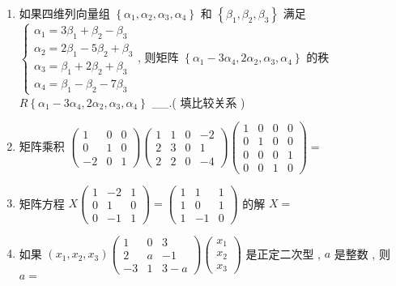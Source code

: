 \documentclass[10pt]{article}
\begin{document}
{\begin{enumerate}
  \item  如果四维列向量组  $\left\{\alpha_{1}, \alpha_{2}, \alpha_{3}, \alpha_{4}\right\}$  和  $\left\{\beta_{1}, \beta_{2}, \beta_{3}\right\}$  满足  $\left\{\begin{array}{c}\alpha_{1}=3 \beta_{1}+\beta_{2}-\beta_{3} \\ \alpha_{2}=2 \beta_{1}-5 \beta_{2}+\beta_{3} \\ \alpha_{3}=\beta_{1}+2 \beta_{2}+\beta_{3} \\ \alpha_{4}=\beta_{1}-\beta_{2}-7 \beta_{3}\end{array}\right.$,  则矩阵  $\left\{\alpha_{1}-3 \alpha_{4}, 2 \alpha_{2}, \alpha_{3}, \alpha_{4}\right\}$  的秩  $R\left\{\alpha_{1}-3 \alpha_{4}, 2 \alpha_{2}, \alpha_{3}, \alpha_{4}\right\}$ \_\_.( 填比较关系 )

  \item  矩阵乘积  $\left(\begin{array}{ccc}1 & 0 & 0 \\ 0 & 1 & 0 \\ -2 & 0 & 1\end{array}\right)\left(\begin{array}{cccc}1 & 1 & 0 & -2 \\ 2 & 3 & 0 & 1 \\ 2 & 2 & 0 & -4\end{array}\right)\left(\begin{array}{llll}1 & 0 & 0 & 0 \\ 0 & 1 & 0 & 0 \\ 0 & 0 & 0 & 1 \\ 0 & 0 & 1 & 0\end{array}\right)=$

  \item  矩阵方程  $X\left(\begin{array}{ccc}1 & -2 & 1 \\ 0 & 1 & 0 \\ 0 & -1 & 1\end{array}\right)=\left(\begin{array}{ccc}1 & 1 & 1 \\ 1 & 0 & 1 \\ 1 & -1 & 0\end{array}\right)$  的解  $X=$

  \item  如果  $\left(x_{1}, x_{2}, x_{3}\right)\left(\begin{array}{ccc}1 & 0 & 3 \\ 2 & a & -1 \\ -3 & 1 & 3-a\end{array}\right)\left(\begin{array}{c}x_{1} \\ x_{2} \\ x_{3}\end{array}\right)$  是正定二次型 , $a$  是整数 ,  则  $a=$


\end{enumerate}}
\end{document}

